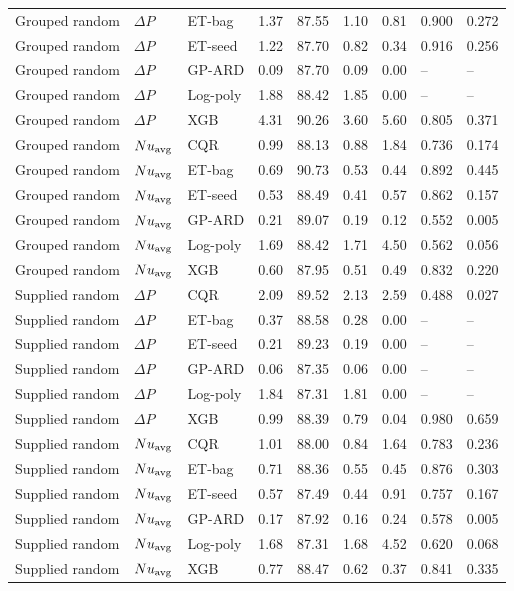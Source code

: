 \begin{longtable}{lllllllll}
Grouped random & $\Delta P$ & ET-bag & 1.37 & 87.55 & 1.10 & 0.81 & 0.900 & 0.272\\
Grouped random & $\Delta P$ & ET-seed & 1.22 & 87.70 & 0.82 & 0.34 & 0.916 & 0.256\\
Grouped random & $\Delta P$ & GP-ARD & 0.09 & 87.70 & 0.09 & 0.00 & -- & --\\
Grouped random & $\Delta P$ & Log-poly & 1.88 & 88.42 & 1.85 & 0.00 & -- & --\\
Grouped random & $\Delta P$ & XGB & 4.31 & 90.26 & 3.60 & 5.60 & 0.805 & 0.371\\
Grouped random & $Nu_{\rm avg}$ & CQR & 0.99 & 88.13 & 0.88 & 1.84 & 0.736 & 0.174\\
Grouped random & $Nu_{\rm avg}$ & ET-bag & 0.69 & 90.73 & 0.53 & 0.44 & 0.892 & 0.445\\
Grouped random & $Nu_{\rm avg}$ & ET-seed & 0.53 & 88.49 & 0.41 & 0.57 & 0.862 & 0.157\\
Grouped random & $Nu_{\rm avg}$ & GP-ARD & 0.21 & 89.07 & 0.19 & 0.12 & 0.552 & 0.005\\
Grouped random & $Nu_{\rm avg}$ & Log-poly & 1.69 & 88.42 & 1.71 & 4.50 & 0.562 & 0.056\\
Grouped random & $Nu_{\rm avg}$ & XGB & 0.60 & 87.95 & 0.51 & 0.49 & 0.832 & 0.220\\
Supplied random & $\Delta P$ & CQR & 2.09 & 89.52 & 2.13 & 2.59 & 0.488 & 0.027\\
Supplied random & $\Delta P$ & ET-bag & 0.37 & 88.58 & 0.28 & 0.00 & -- & --\\
Supplied random & $\Delta P$ & ET-seed & 0.21 & 89.23 & 0.19 & 0.00 & -- & --\\
Supplied random & $\Delta P$ & GP-ARD & 0.06 & 87.35 & 0.06 & 0.00 & -- & --\\
Supplied random & $\Delta P$ & Log-poly & 1.84 & 87.31 & 1.81 & 0.00 & -- & --\\
Supplied random & $\Delta P$ & XGB & 0.99 & 88.39 & 0.79 & 0.04 & 0.980 & 0.659\\
Supplied random & $Nu_{\rm avg}$ & CQR & 1.01 & 88.00 & 0.84 & 1.64 & 0.783 & 0.236\\
Supplied random & $Nu_{\rm avg}$ & ET-bag & 0.71 & 88.36 & 0.55 & 0.45 & 0.876 & 0.303\\
Supplied random & $Nu_{\rm avg}$ & ET-seed & 0.57 & 87.49 & 0.44 & 0.91 & 0.757 & 0.167\\
Supplied random & $Nu_{\rm avg}$ & GP-ARD & 0.17 & 87.92 & 0.16 & 0.24 & 0.578 & 0.005\\
Supplied random & $Nu_{\rm avg}$ & Log-poly & 1.68 & 87.31 & 1.68 & 4.52 & 0.620 & 0.068\\
Supplied random & $Nu_{\rm avg}$ & XGB & 0.77 & 88.47 & 0.62 & 0.37 & 0.841 & 0.335\\
\bottomrule\end{longtable}
